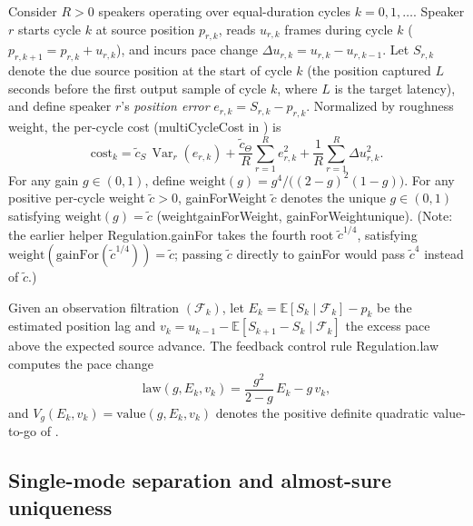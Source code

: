 \documentclass[11pt,a4paper]{article}
\DeclareRobustCommand{\lean}[1]{{\ttfamily\def\_{\textunderscore\allowbreak}#1}}
\newcommand{\E}{\mathbb{E}}
\theoremstyle{definition}
\begin{document}
Consider $R > 0$ speakers operating over equal-duration cycles
$k = 0, 1, \dots$. Speaker $r$ starts cycle $k$ at source position $p_{r,k}$,
reads $u_{r,k}$ frames during cycle $k$ ($p_{r,k+1} = p_{r,k} + u_{r,k}$), and
incurs pace change $\Delta u_{r,k} = u_{r,k} - u_{r,k-1}$. Let $S_{r,k}$ denote
the due source position at the start of cycle $k$ (the position captured $L$
seconds before the first output sample of cycle $k$, where $L$ is the target
latency), and define speaker $r$'s \emph{position error}
$e_{r,k} = S_{r,k} - p_{r,k}$. Normalized by roughness weight, the per-cycle
cost (\lean{multiCycleCost} in
) is
\[
  \mathrm{cost}_k = \tilde c_S\,\operatorname{Var}_r(e_{r,k})
      + \frac{\tilde c_\Theta}{R}\sum_{r=1}^R e_{r,k}^2
      + \frac{1}{R}\sum_{r=1}^R \Delta u_{r,k}^2 .
\]
For any gain $g \in (0, 1)$, define
$\mathrm{weight}(g) = g^4 / \bigl((2 - g)^2(1 - g)\bigr)$. For any positive
per-cycle weight $\tilde c > 0$, \lean{gainForWeight} $\tilde c$ denotes the
unique $g \in (0, 1)$ satisfying $\mathrm{weight}(g) = \tilde c$
(\lean{weight\_gainForWeight}, \lean{gainForWeight\_unique}). (Note: the
earlier helper \lean{Regulation.gainFor} takes the fourth root $\tilde c^{1/4}$,
satisfying $\mathrm{weight}(\mathrm{gainFor}(\tilde c^{1/4})) = \tilde c$;
passing $\tilde c$ directly to \lean{gainFor} would pass $\tilde c^4$ instead
of $\tilde c$.)

Given an observation filtration $(\mathcal{F}_k)$, let
$E_k = \E[S_k \mid \mathcal{F}_k] - p_k$ be the estimated position lag and
$v_k = u_{k-1} - \E[S_{k+1} - S_k \mid \mathcal{F}_k]$ the excess pace above
the expected source advance. The feedback control rule \lean{Regulation.law}
computes the pace change
\[
  \mathrm{law}(g, E_k, v_k) = \frac{g^2}{2 - g}\,E_k - g\,v_k,
\]
and $V_g(E_k, v_k) = \mathrm{value}(g, E_k, v_k)$ denotes the positive definite
quadratic value-to-go of .

\subsection{Single-mode separation and almost-sure uniqueness}
\end{document}
